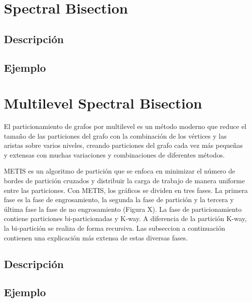\section{Spectral Bisection}\label{Spectral-Bisection}

\subsection{Descripción}

\subsection{Ejemplo}

\section{Multilevel Spectral Bisection}\label{Multilevel-Spectral-Bisection}

El particionamiento de grafos por multilevel es un método moderno que reduce el tamaño de las particiones del grafo con la combinación de los vértices y las aristas sobre varios niveles, creando particiones del grafo cada vez más pequeñas y extensas con muchas variaciones y combinaciones de diferentes métodos.

METIS es un algoritmo de partición que se enfoca en minimizar el número de bordes de partición cruzados y distribuir la carga de trabajo de manera uniforme entre las particiones. Con METIS, los gráficos se dividen en tres fases. La primera fase es la fase de engrosamiento, la segunda la fase de partición y la tercera y última fase la fase de no engrosamiento (Figura X). La fase de particionamiento contiene particiones bi-particionadas y K-way. A diferencia de la partición K-way, la bi-partición se realiza de forma recursiva. Las subseccion a continuación contienen una explicación más extensa de estas diversas fases.

\subsection{Descripción}

\subsection{Ejemplo}

